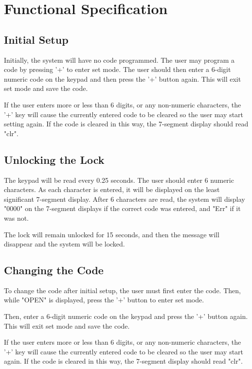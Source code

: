 \documentclass[11pt]{article}
\begin{document}
\section{Functional Specification}

\subsection{Initial Setup}

Initially, the system will have no code programmed. The user may program a code by pressing '+' to enter set mode. The user should then enter a 6-digit numeric code on the keypad and then press the '+' button again. This will exit set mode and save the code.

If the user enters more or less than 6 digits, or any non-numeric characters, the '+' key will cause the currently entered code to be cleared so the user may start setting again. If the code is cleared in this way, the 7-segment display should read "clr".

\subsection{Unlocking the Lock}

The keypad will be read every 0.25 seconds. The user should enter 6 numeric characters. As each character is entered,  it will be displayed on the least significant 7-segment display. After 6 characters are read, the system will display "0000" on the 7-segment displays if the correct code was entered, and "Err" if it was not.

The lock will remain unlocked for 15 seconds, and then the message will disappear and the system will be locked.

\subsection{Changing the Code}

To change the code after initial setup, the user must first enter the code. Then, while "OPEN" is displayed, press the '+' button to enter set mode.

Then, enter a 6-digit numeric code on the keypad and press the '+' button again. This will exit set mode and save the code.

If the user enters more or less than 6 digits, or any non-numeric characters, the '+' key will cause the currently entered code to be cleared so the user may start again. If the code is cleared in this way, the 7-segment display should read "clr".
\end{document}
